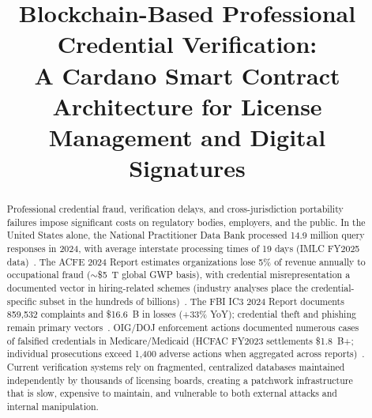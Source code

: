 \documentclass[conference,10pt]{IEEEtran}
\begin{document}
\title{Blockchain-Based Professional Credential Verification:\\
A Cardano Smart Contract Architecture for License Management and Digital Signatures}

\author{
}

\maketitle

\begin{abstract}
Professional credential fraud, verification delays, and cross-jurisdiction portability failures impose significant costs on regulatory bodies, employers, and the public. In the United States alone, the National Practitioner Data Bank processed 14.9 million query responses in 2024, with average interstate processing times of 19 days (IMLC FY2025 data)~\cite{hrsa2025}. The ACFE 2024 Report estimates organizations lose 5\% of revenue annually to occupational fraud (${\sim}$\$5~T global GWP basis), with credential misrepresentation a documented vector in hiring-related schemes (industry analyses place the credential-specific subset in the hundreds of billions)~\cite{acfe2024}. The FBI IC3 2024 Report documents 859,532 complaints and \$16.6~B in losses (+33\% YoY); credential theft and phishing remain primary vectors~\cite{fbiic32024}. OIG/DOJ enforcement actions documented numerous cases of falsified credentials in Medicare/Medicaid (HCFAC FY2023 settlements \$1.8~B+; individual prosecutions exceed 1,400 adverse actions when aggregated across reports)~\cite{oighcfac2023}. Current verification systems rely on fragmented, centralized databases maintained independently by thousands of licensing boards, creating a patchwork infrastructure that is slow, expensive to maintain, and vulnerable to both external attacks and internal manipulation.


\end{abstract}
\end{document}
